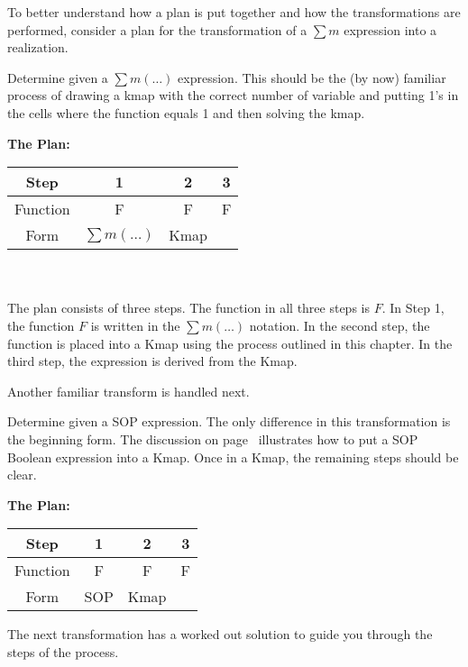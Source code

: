 To better understand how a plan is put together and how the
transformations are performed, consider a plan for the
transformation of a $\sum m$ expression into a \SOPmin realization.

\begin{process}{Determine \SOPmin given a $\sum m(\ldots)$ expression.}
\label{process:minimizationSumToSOP}
This should be the (by now) familiar process of drawing a kmap 
with the correct number of variable and putting 1's in the cells
where the function equals 1 and then solving the kmap.

\textbf{The Plan:}

\begin{tabular}{|c|c|c|c|}\hline
Step	  & 1  & 2  & 3   \\ \hline
Function  & F  & F  & F \\ \hline
Form	  & $\sum m(\ldots)$ & Kmap & \SOPmin \\ \hline
\end{tabular}
\\ \\
The plan consists of three steps.  The function in all three steps is $F$.   
In Step 1, the function $F$ is written in the $\sum m(\ldots)$
notation.  In the second step, the function is placed into
a Kmap using the process outlined in this chapter. In the 
third step, the \SOPmin expression is derived from the Kmap.
\end{process}

Another familiar transform is handled next.
\begin{process}{Determine  \SOPmin given a SOP expression.}
\label{process:minimizationSOPToSOP}
The only difference in this transformation is the beginning 
form.  The discussion on page~\pageref{page:SymbToSymb} 
illustrates how to put a SOP Boolean expression into a Kmap.  
Once in a Kmap, the remaining steps should be clear.  

\textbf{The Plan:}

\begin{tabular}{|c|c|c|c|}\hline
Step	  & 1  & 2  & 3   \\ \hline
Function  & F  & F  & F \\ \hline
Form	  & SOP & Kmap & \SOPmin \\ \hline
\end{tabular}
\end{process}

The next transformation has a worked out solution to guide
you through the steps of the process.

